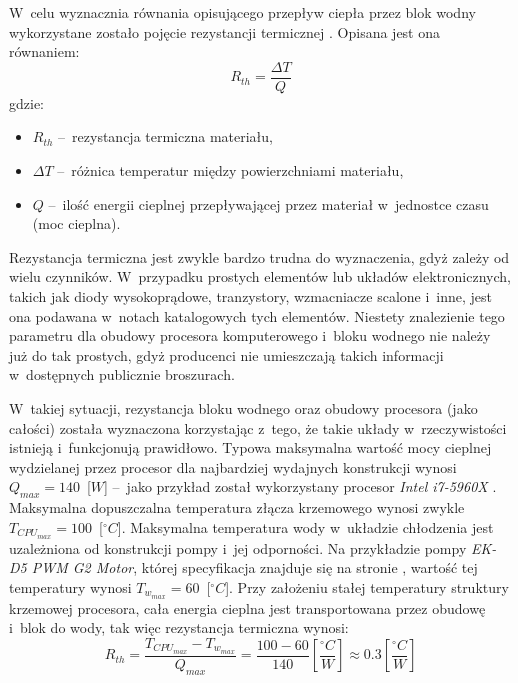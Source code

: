 W~celu wyznacznia równania opisującego przepływ ciepła przez blok wodny
wykorzystane zostało pojęcie rezystancji termicznej \cite{ThermalResistance}.
Opisana jest ona równaniem:
\begin{equation}
    R_{th} = \frac{\Delta T}{Q}
    \label{equ:thermalresistance}
\end{equation}
gdzie:
\begin{itemize}
    \item $R_{th}$ --~rezystancja termiczna materiału,
    \item $\Delta T$ --~różnica temperatur między powierzchniami materiału,
    \item $Q$ --~ilość energii cieplnej przepływającej przez materiał
    w~jednostce czasu (moc cieplna).
\end{itemize}

Rezystancja termiczna jest zwykle bardzo trudna do wyznaczenia, gdyż zależy od
wielu czynników. W~przypadku prostych elementów lub układów elektronicznych,
takich jak diody wysokoprądowe, tranzystory, wzmacniacze scalone i~inne, jest
ona podawana w~notach katalogowych tych elementów. Niestety znalezienie tego
parametru dla obudowy procesora komputerowego i~bloku wodnego nie należy już do
tak prostych, gdyż producenci nie umieszczają takich informacji w~dostępnych
publicznie broszurach.

W~takiej sytuacji, rezystancja bloku wodnego oraz obudowy procesora (jako
całości) została wyznaczona korzystając z~tego, że takie układy w~rzeczywistości
istnieją i~funkcjonują prawidłowo. Typowa maksymalna wartość mocy cieplnej
wydzielanej przez procesor dla najbardziej wydajnych konstrukcji wynosi
$Q_{max} = 140$~[$W$] --~jako przykład został wykorzystany procesor
\textit{Intel i7-5960X} \cite{Inteli7}. Maksymalna dopuszczalna temperatura
złącza krzemowego wynosi zwykle $T_{CPU_{max}} = 100$~[$^\circ C$]. Maksymalna
temperatura wody w~układzie chłodzenia jest uzależniona od konstrukcji pompy
i~jej odporności. Na przykładzie pompy \textit{EK-D5 PWM G2 Motor}, której
specyfikacja znajduje się na stronie \cite{EKWBpump}, wartość tej temperatury
wynosi $T_{w_{max}} = 60$~[$^\circ C$]. Przy założeniu stałej temperatury
struktury krzemowej procesora, cała energia cieplna jest transportowana przez
obudowę i~blok do wody, tak więc rezystancja termiczna wynosi:
\begin{equation}
    R_{th} = \frac{T_{CPU_{max}} - T_{w_{max}}}{Q_{max}} = \frac{100 - 60}{140}
    \left[ \frac{^\circ C}{W} \right] \approx 0.3 \left[ \frac{^\circ C}{W}
    \right]
    \label{equ:wbresistance}
\end{equation}


